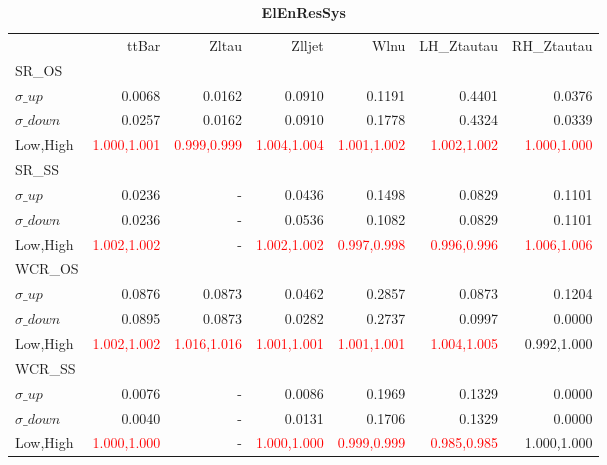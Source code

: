 \documentclass[11pt,oneside,a4paper]{article}
\begin{document}
\begin{table}
\caption{\bf{ElEnResSys}}
\centering
\begin{tabular}{lrrrrrr}
& ttBar & Zltau & Zlljet & Wlnu & LH\_Ztautau & RH\_Ztautau \\

SR\_OS &  &  &  &  &  &  \\
$\sigma\_up$ & 0.0068 & 0.0162 & 0.0910 & 0.1191 & 0.4401 & 0.0376 \\
$\sigma\_down$ & 0.0257 & 0.0162 & 0.0910 & 0.1778 & 0.4324 & 0.0339 \\
Low,High & \textcolor{red}{1.000,1.001} & \textcolor{red}{0.999,0.999} & \textcolor{red}{1.004,1.004} & \textcolor{red}{1.001,1.002} & \textcolor{red}{1.002,1.002} & \textcolor{red}{1.000,1.000} \\

\hline
SR\_SS &  &  &  &  &  &  \\
$\sigma\_up$ & 0.0236 & - & 0.0436 & 0.1498 & 0.0829 & 0.1101 \\
$\sigma\_down$ & 0.0236 & - & 0.0536 & 0.1082 & 0.0829 & 0.1101 \\
Low,High & \textcolor{red}{1.002,1.002} & - & \textcolor{red}{1.002,1.002} & \textcolor{red}{0.997,0.998} & \textcolor{red}{0.996,0.996} & \textcolor{red}{1.006,1.006} \\

\hline
WCR\_OS &  &  &  &  &  &  \\
$\sigma\_up$ & 0.0876 & 0.0873 & 0.0462 & 0.2857 & 0.0873 & 0.1204 \\
$\sigma\_down$ & 0.0895 & 0.0873 & 0.0282 & 0.2737 & 0.0997 & 0.0000 \\
Low,High & \textcolor{red}{1.002,1.002} & \textcolor{red}{1.016,1.016} & \textcolor{red}{1.001,1.001} & \textcolor{red}{1.001,1.001} & \textcolor{red}{1.004,1.005} & 0.992,1.000 \\

\hline
WCR\_SS &  &  &  &  &  &  \\
$\sigma\_up$ & 0.0076 & - & 0.0086 & 0.1969 & 0.1329 & 0.0000 \\
$\sigma\_down$ & 0.0040 & - & 0.0131 & 0.1706 & 0.1329 & 0.0000 \\
Low,High & \textcolor{red}{1.000,1.000} & - & \textcolor{red}{1.000,1.000} & \textcolor{red}{0.999,0.999} & \textcolor{red}{0.985,0.985} & 1.000,1.000 \\

\end{tabular}
\end{table}
\end{document}
